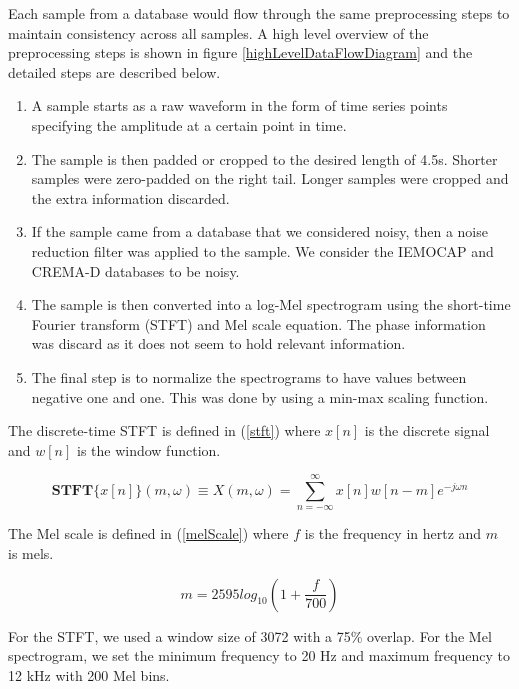 \documentclass[conference]{IEEEtran}
\begin{document}
Each sample from a database would flow through the same preprocessing steps to maintain consistency across all samples. A high level overview of the preprocessing steps is shown in figure \ref{highLevelDataFlowDiagram} and the detailed steps are described below.
\begin{enumerate}
	\item A sample starts as a raw waveform in the form of time series points specifying the amplitude at a certain point in time.
	\item The sample is then padded or cropped to the desired length of 4.5s. Shorter samples were zero-padded on the right tail. Longer samples were cropped and the extra information discarded.
	\item If the sample came from a database that we considered noisy, then a noise reduction filter was applied to the sample. We consider the IEMOCAP and CREMA-D databases to be noisy.
	\item The sample is then converted into a log-Mel spectrogram using the short-time Fourier transform (STFT) and Mel scale equation. The phase information was discard as it does not seem to hold relevant information. \cite{Kozakowski2017}
	\item The final step is to normalize the spectrograms to have values between negative one and one. This was done by using a min-max scaling function.
\end{enumerate}

The discrete-time STFT is defined in (\ref{stft}) where $x[n]$ is the discrete signal and $w[n]$ is the window function.

\begin{equation}
	\label{stft}
	\mathbf{STFT}\{x[n]\}(m,\omega) \equiv X(m,\omega) = \sum_{n=-\infty}^{\infty}x[n]w[n-m]e^{-j \omega n}
\end{equation}

The Mel scale is defined in (\ref{melScale}) where $f$ is the frequency in hertz and $m$ is mels.\cite{Oshaughnessy1990}

\begin{equation}
\label{melScale}
m = 2595 log_{10}(1 + \frac{f}{700})
\end{equation}

For the STFT, we used a window size of 3072 with a 75\% overlap. For the Mel spectrogram, we set the minimum frequency to 20 Hz and maximum frequency to 12 kHz with 200 Mel bins.
\end{document}

